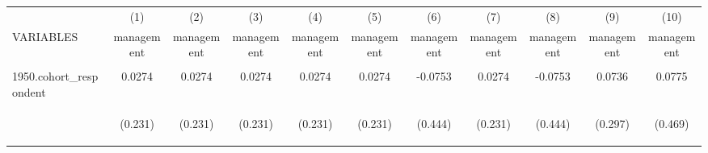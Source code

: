 \begin{center}
\begin{tabular}{lcccccccccc} \hline
 & (1) & (2) & (3) & (4) & (5) & (6) & (7) & (8) & (9) & (10) \\
VARIABLES & management & management & management & management & management & management & management & management & management & management \\ \hline
\vspace{4pt} & \begin{footnotesize}\end{footnotesize} & \begin{footnotesize}\end{footnotesize} & \begin{footnotesize}\end{footnotesize} & \begin{footnotesize}\end{footnotesize} & \begin{footnotesize}\end{footnotesize} & \begin{footnotesize}\end{footnotesize} & \begin{footnotesize}\end{footnotesize} & \begin{footnotesize}\end{footnotesize} & \begin{footnotesize}\end{footnotesize} & \begin{footnotesize}\end{footnotesize} \\
1950.cohort\_respondent & 0.0274 & 0.0274 & 0.0274 & 0.0274 & 0.0274 & -0.0753 & 0.0274 & -0.0753 & 0.0736 & 0.0775 \\
\vspace{4pt} & \begin{footnotesize}(0.231)\end{footnotesize} & \begin{footnotesize}(0.231)\end{footnotesize} & \begin{footnotesize}(0.231)\end{footnotesize} & \begin{footnotesize}(0.231)\end{footnotesize} & \begin{footnotesize}(0.231)\end{footnotesize} & \begin{footnotesize}(0.444)\end{footnotesize} & \begin{footnotesize}(0.231)\end{footnotesize} & \begin{footnotesize}(0.444)\end{footnotesize} & \begin{footnotesize}(0.297)\end{footnotesize} & \begin{footnotesize}(0.469)\end{footnotesize} \\

\end{tabular}
\end{center}
